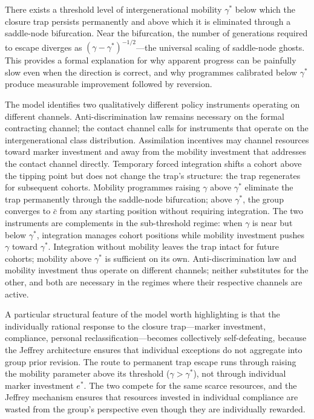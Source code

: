 \documentclass[pdflatex,sn-basic]{sn-jnl}
\theoremstyle{thmstyleone}
\numberwithin{proposition}{subsection}
\begin{document}
There exists a threshold level of intergenerational mobility
$\gamma^*$ below which the closure trap persists permanently and
above which it is eliminated through a saddle-node bifurcation.
Near the bifurcation, the number of generations required to escape
diverges as $(\gamma - \gamma^*)^{-1/2}$---the universal scaling of
saddle-node ghosts. This provides a formal explanation for why
apparent progress can be painfully slow even when the direction is
correct, and why programmes calibrated below $\gamma^*$ produce
measurable improvement followed by reversion.


The model identifies two qualitatively different policy instruments
operating on different channels. Anti-discrimination law remains
necessary on the formal contracting channel; the contact channel
calls for instruments that operate on the intergenerational class
distribution. Assimilation incentives may channel resources toward
marker investment and away from the mobility
investment that addresses the contact channel directly.
Temporary forced integration shifts a cohort above the tipping point
but does not change the trap's structure: the trap regenerates for
subsequent cohorts. Mobility programmes raising
$\gamma$ above $\gamma^*$ eliminate the trap permanently through the
saddle-node bifurcation; above $\gamma^*$, the group converges to
$\bar{c}$ from any starting position without requiring integration.
The two instruments are complements in the sub-threshold regime:
when $\gamma$ is near but below $\gamma^*$, integration manages
cohort positions while mobility investment pushes $\gamma$ toward
$\gamma^*$. Integration without mobility leaves the trap intact for
future cohorts; mobility above $\gamma^*$ is sufficient on its own.
Anti-discrimination law and mobility investment thus
operate on different channels; neither substitutes for the other, and both are
necessary in the regimes where their respective channels are
active.


A particular structural feature of the model worth highlighting is that the individually rational response to the
closure trap---marker investment, compliance, personal
reclassification---becomes collectively self-defeating, because the
Jeffrey architecture ensures that individual exceptions do not
aggregate into group prior revision. The route to permanent trap
escape runs through raising the mobility parameter above its
threshold ($\gamma > \gamma^*$), not through individual marker
investment $e^*$. The
two compete for the same scarce resources, and the Jeffrey
mechanism ensures that resources invested in individual compliance
are wasted from the group's perspective even though they are
individually rewarded. 
\end{document}
